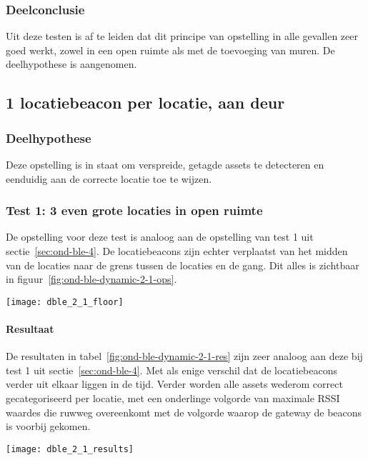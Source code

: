\subsubsection{Deelconclusie}
Uit deze testen is af te leiden dat dit principe van opstelling in alle gevallen zeer goed werkt, zowel in een open ruimte als met de toevoeging van muren. De deelhypothese is aangenomen.
	
\subsection{1 locatiebeacon per locatie, aan deur}
\label{sec:ond-ble-5}
\subsubsection{Deelhypothese}
Deze opstelling is in staat om verspreide, getagde assets te detecteren en eenduidig aan de correcte locatie toe te wijzen.

\subsubsection{Test 1: 3 even grote locaties in open ruimte}
\label{sec:ond-ble-5-1}
\begin{minipage}{0.55\textwidth}
De opstelling voor deze test is analoog aan de opstelling van test 1 uit sectie~\ref{sec:ond-ble-4}. De locatiebeacons zijn echter verplaatst van het midden van de locaties naar de grens tussen de locaties en de gang. Dit alles is zichtbaar in figuur~\ref{fig:ond-ble-dynamic-2-1-ops}.
\end{minipage}
\hfill
\begin{minipage}{0.42\textwidth}
	\texttt{[image: dble\_2\_1\_floor]}
	\label{fig:ond-ble-dynamic-2-1-ops}
\end{minipage}

\paragraph{Resultaat}
\begin{minipage}{0.42\textwidth}
De resultaten in tabel~\ref{fig:ond-ble-dynamic-2-1-res} zijn zeer analoog aan deze bij test 1 uit sectie~\ref{sec:ond-ble-4}. Met als enige verschil dat de locatiebeacons verder uit elkaar liggen in de tijd. Verder worden alle assets wederom correct gecategoriseerd per locatie, met een onderlinge volgorde van maximale RSSI waardes die ruwweg overeenkomt met de volgorde waarop de gateway de beacons is voorbij gekomen. 
\end{minipage}
\hfill
\begin{minipage}{0.55\textwidth}
	\texttt{[image: dble\_2\_1\_results]}
	\label{fig:ond-ble-dynamic-2-1-res}
\end{minipage}

